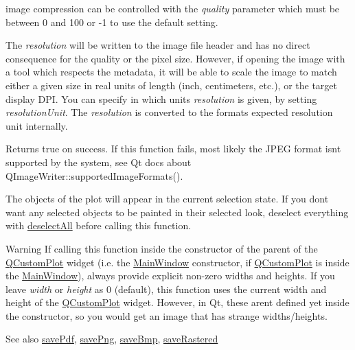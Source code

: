 image compression can be controlled with the {\itshape quality} parameter which must be between 0 and 100 or -\/1 to use the default setting.

The {\itshape resolution} will be written to the image file header and has no direct consequence for the quality or the pixel size. However, if opening the image with a tool which respects the metadata, it will be able to scale the image to match either a given size in real units of length (inch, centimeters, etc.), or the target display D\+PI. You can specify in which units {\itshape resolution} is given, by setting {\itshape resolution\+Unit}. The {\itshape resolution} is converted to the format\textquotesingle{}s expected resolution unit internally.

Returns true on success. If this function fails, most likely the J\+P\+EG format isn\textquotesingle{}t supported by the system, see Qt docs about Q\+Image\+Writer\+::supported\+Image\+Formats().

The objects of the plot will appear in the current selection state. If you don\textquotesingle{}t want any selected objects to be painted in their selected look, deselect everything with \mbox{\hyperlink{class_q_custom_plot_a9d4808ab925b003054085246c92a257c}{deselect\+All}} before calling this function.

\begin{DoxyWarning}{Warning}
If calling this function inside the constructor of the parent of the \mbox{\hyperlink{class_q_custom_plot}{Q\+Custom\+Plot}} widget (i.\+e. the \mbox{\hyperlink{class_main_window}{Main\+Window}} constructor, if \mbox{\hyperlink{class_q_custom_plot}{Q\+Custom\+Plot}} is inside the \mbox{\hyperlink{class_main_window}{Main\+Window}}), always provide explicit non-\/zero widths and heights. If you leave {\itshape width} or {\itshape height} as 0 (default), this function uses the current width and height of the \mbox{\hyperlink{class_q_custom_plot}{Q\+Custom\+Plot}} widget. However, in Qt, these aren\textquotesingle{}t defined yet inside the constructor, so you would get an image that has strange widths/heights.
\end{DoxyWarning}
\begin{DoxySeeAlso}{See also}
\mbox{\hyperlink{class_q_custom_plot_ad5acd34f6b39c3516887d7e54fec2412}{save\+Pdf}}, \mbox{\hyperlink{class_q_custom_plot_ac92cc9256d12f354b40a4be4600b5fb9}{save\+Png}}, \mbox{\hyperlink{class_q_custom_plot_ae3a86ed0795670e50afa21759d4fa13d}{save\+Bmp}}, \mbox{\hyperlink{class_q_custom_plot_ad7723ce2edfa270632ef42b03a444352}{save\+Rastered}} 
\end{DoxySeeAlso}
\mbox{\label{class_q_custom_plot_ad5acd34f6b39c3516887d7e54fec2412}} 
